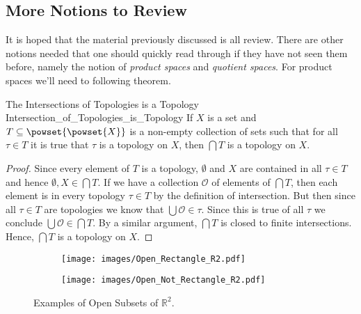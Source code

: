     \subsection{More Notions to Review}
        It is hoped that the material previously discussed is all
        review. There are other notions needed that one should quickly
        read through if they have not seen them before, namely the
        notion of \textit{product spaces} and \textit{quotient spaces}.
        For product spaces we'll need to following theorem.
        \begin{ltheorem}{The Intersections of Topologies is a Topology}
                        {Intersection_of_Topologies_is_Topology}
            If $X$ is a set and $T\subseteq\powset{\powset{X}}$ is a
            non-empty collection of sets such that for all $\tau\in{T}$
            it is true that $\tau$ is a topology on $X$, then
            $\bigcap{T}$ is a topology on $X$.
        \end{ltheorem}
        \begin{proof}
            Since every element of $T$ is a topology, $\emptyset$ and
            $X$ are contained in all $\tau\in{T}$ and hence
            $\emptyset,X\in\bigcap{T}$. If we have a collection
            $\mathcal{O}$ of elements of $\bigcap{T}$, then each element
            is in every topology $\tau\in{T}$ by the definition of
            intersection. But then since all $\tau\in{T}$ are topologies
            we know that $\bigcup\mathcal{O}\in\tau$. Since this is true
            of all $\tau$ we conclude $\bigcup\mathcal{O}\in\bigcap{T}$.
            By a similar argument, $\bigcap{T}$ is closed to finite
            intersections. Hence, $\bigcap{T}$ is a topology on $X$.
        \end{proof}
        \begin{figure}
            \centering
            \captionsetup{type=figure}
            \begin{subfigure}[b]{0.49\textwidth}
                \centering
                \texttt{[image: images/Open\_Rectangle\_R2.pdf]}
                \label{fig:Open_Rectangle_in_R2}
            \end{subfigure}
            \begin{subfigure}[b]{0.49\textwidth}
                \centering
                \texttt{[image: images/Open\_Not\_Rectangle\_R2.pdf]}
                \label{fig:Open_Subset_Not_Product}
            \end{subfigure}
            \caption{Examples of Open Subsets of $\mathbb{R}^{2}$.}
            \label{fig:Point_Set_Top_Open_Subsets_R2}
        \end{figure}
